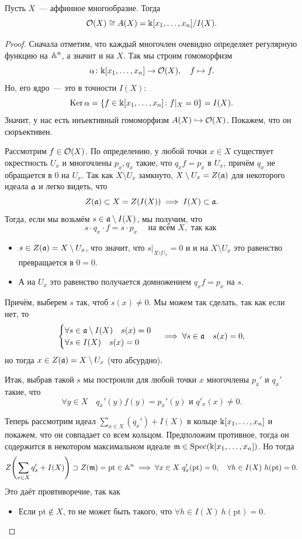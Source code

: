 	\begin{theorem}\label{O(X) = A(X)} 
		Пусть $X$~--- аффинное многообразие. Тогда 
		\[
			\cO(X) \cong A(X) = \Bbbk[x_1, \ldots, x_n]/I(X).
		\]
	\end{theorem}
	\begin{proof}
		Сначала отметим, что каждый многочлен очевидно определяет регулярную функцию на $\AA^n$, а значит и на $X$. Так мы строим гомоморфизм 
		\[
			\alpha\colon \Bbbk[x_1, \ldots, x_n] \to \cO(X), \quad f \mapsto f.
		\]
		Но, его ядро~--- это в точности $I(X)$: 
		\[
			\Ker{\alpha} = \{ f \in \bk[x_1, \ldots, x_n]\colon f\vert_{X} = 0 \} = I(X).
		\]
		Значит, у нас есть инъективный гомоморфизм $A(X) \hookrightarrow \cO(X)$. Покажем, что он сюръективен. 

		 Рассмотрим $f \in \cO(X)$. По определению, у любой точки $x \in X$ существует окрестность $U_x$ и многочлены $p_x, q_x$ такие, что $q_x f = p_x$ в $U_x$, причём $q_x$ не обращается в 0 на $U_x$. Так как $X \setminus U_x$ замкнуто, $X \setminus U_x = Z(\fa)$ для некоторого идеала $\fa$ и легко видеть, что 
		 \[
		 	Z(\fa) \subset X = Z(I(X)) \implies I(X) \subset \fa.
		 \]
		 Тогда, если мы возьмём $s \in \fa \setminus I(X)$, мы получим, что
		 \[
		 	s \cdot q_x \cdot f = s \cdot p_x \quad \text{ на всём } X, \text{ так как }
		 \]
		 \begin{itemize}
		 	\item $s \in Z(\fa) = X \setminus U_x$, что значит, что $s\vert_{X \setminus U_x} = 0$ и и на $X \setminus U_x$ это равенство превращается в $0 = 0$.

		 	\item А на $U_x$ это равенство получается домножением $q_x f = p_x$ на $s$.
		 \end{itemize}

		 Причём, выберем $s$ так, чтоб $s(x) \neq 0$. Мы можем так сделать, так как если нет, то 
		 \[
		 	\begin{cases} \forall s \in \fa \setminus I(X) \quad s(x) = 0 \\ \forall s \in I(X) \quad s(x) = 0 \end{cases} \implies \forall s \in \fa \quad s(x) = 0,
		 \]
		 но тогда $x \in Z(\fa) = X \setminus U_x$ (что абсурдно). 
		 
		 Итак, выбрав такой $s$ мы построили для любой точки $x$ многочлены $p_x'$ и $q_x'$ такие, что 
		 \[
		 	\forall y \in X \quad q_{x}'(y) f(y) = p_x'(y)  \text{ и } q'_x(x) \neq 0.
		 \]
 
		 Теперь рассмотрим идеал $\sum_{x \in X} (q_x') + I(X)$ в кольце $\bk[x_1, \ldots, x_n]$ и покажем, что он совпадает со всем кольцом. Предположим противное, тогда он содержится в некотором максимальном идеале $\fm \in \Spec(\bk[x_1, \ldots, x_n])$. Но тогда 
		 \[
		  	Z\lr*{\sum_{x \in X} q_x' + I(X)} \supset Z(\fm) = \mathrm{pt} \in \AA^n \implies \forall x \in X \ q'_x(\mathrm{pt}) = 0, \quad \forall h \in I(X) \ h(\mathrm{pt}) = 0.
		  \] 
		  Это даёт провтиворечие, так как 
		  \begin{itemize}
		  	\item Если $\mathrm{pt} \notin X$, то не может быть такого, что $\forall h \in I(X) \ h(\mathrm{pt}) = 0$. 


\end{itemize}
\end{proof}
